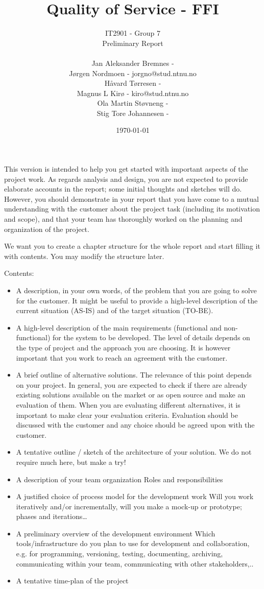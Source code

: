 \documentclass[12pt]{article}
\title{Quality of Service - FFI}
\author{
        IT2901 - Group 7  \\ 
        Preliminary Report 
        \\ \\
        Jan Aleksander Bremnes - \\
        Jørgen Nordmoen - jorgno@stud.ntnu.no\\
        Håvard Tørresen - \\
        Magnus L Kirø - kiro@stud.ntnu.no\\
        Ola Martin Støvneng - \\
        Stig Tore Johannesen - \\
}
\date{\today}
\begin{document}
\maketitle
\titlepage
{}

\begin{should contain}
This version is intended to help you get started with important aspects of the project work. As regards analysis and design, you are not expected to provide elaborate accounts in the report; some initial thoughts and sketches will do. However, you should demonstrate in your report that you have come to a mutual understanding with the customer about the project task (including its motivation and scope), and that your team has thoroughly worked on the planning and organization of the project. 

We want you to create a chapter structure for the whole report and start filling it with contents. You may modify the structure later. 

Contents:
\begin{itemize}
\item A description, in your own words, of the problem that you are going to solve for the customer. It might be useful to provide a high-level description of the current situation (AS-IS) and of the target situation (TO-BE).
\item A high-level description of the main requirements (functional and non-functional) for the system to be developed. The level of details depends on the type of project and the approach you are choosing. It is however important that you work to reach an agreement with the customer.
\item A brief outline of alternative solutions. The relevance of this point depends on your project. In general, you are expected to check if there are already existing solutions available on the market or as open source and make an evaluation of them. When you are evaluating different alternatives, it is important to make clear your evaluation criteria. Evaluation should be discussed with the customer and any choice should be agreed upon with the customer.
\item A tentative outline / sketch of the architecture of your solution. 
We do not require much here, but make a try!  
\item A description of your team organization
Roles and responsibilities
\item A justified choice of process model for the development work 
Will you work iteratively and/or incrementally, will you make a mock-up or prototype; phases and iterations…
\item A preliminary overview of the development environment 
Which tools/infrastructure do you plan to use for development and collaboration, e.g. for programming, versioning, testing, documenting, archiving, communicating within your team, communicating with other stakeholders,..
\item A tentative time-plan of the project
\end{itemize}
\end{should contain}
\end{document}

